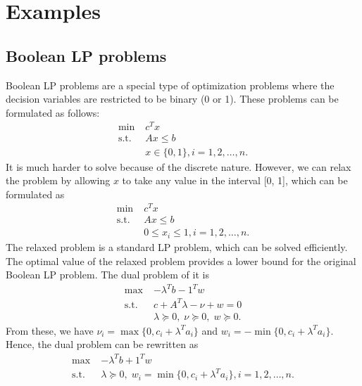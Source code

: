 \documentclass[lang=en,color=blue,mode=fancy,titlestyle=hang]{elegantbook}
\begin{document}
\section{Examples}
\subsection{Boolean LP problems}

Boolean LP problems are a special type of optimization problems where the decision variables are
restricted to be binary (0 or 1). These problems can be formulated as follows:
\begin{align*}
\min \; &c^T x\\
\text{s.t.} \; &Ax \leq b\\
&x \in \{0, 1\}, i = 1, 2, \ldots, n.
\end{align*}
It is much harder to solve because of the discrete nature. However, we can relax the problem by allowing
$x$ to take any value in the interval [0, 1], which can be formulated as
\begin{align*}
\min \; &c^T x\\
\text{s.t.} \; &Ax \leq b\\
&0 \leq x_i \leq 1, i = 1, 2, \ldots, n.
\end{align*}
The relaxed problem is a standard LP problem, which can be solved efficiently. The optimal value of
the relaxed problem provides a lower bound for the original Boolean LP problem. The dual problem of
it is
\begin{align*}
\max \; &-\lambda^T b - 1^T w\\
\text{s.t.} \; &c + A^T \lambda - \nu + w = 0\\
&\lambda \succeq 0, \; \nu \succeq 0, \; w \succeq 0.
\end{align*}
From these, we have $\nu_i = \max\{0, c_i + \lambda^T a_i\}$ and $w_i = -\min\{0, c_i + \lambda^T a_i\}$.
Hence, the dual problem can be rewritten as
\begin{align*}
\max \; &-\lambda^T b + 1^T w\\
\text{s.t.} \; &\lambda \succeq 0, \; w_i = \min\{0, c_i + \lambda^T a_i\}, i = 1, 2, \ldots, n.
\end{align*}
\end{document}
